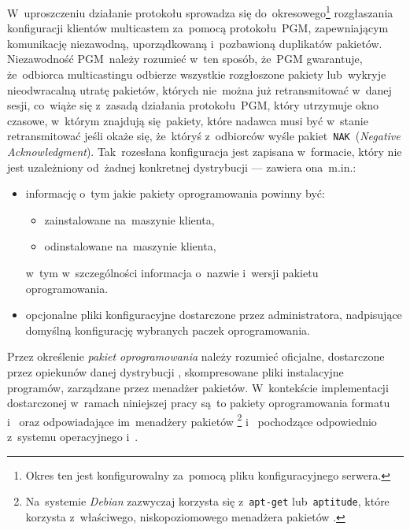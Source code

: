 \documentclass[thesis]{subfiles}
\begin{document}
W~uproszczeniu działanie protokołu sprowadza się do~okresowego\footnote{Okres ten jest konfigurowalny za~pomocą pliku konfiguracyjnego serwera.} rozgłaszania konfiguracji klientów multicastem za~pomocą protokołu~PGM, zapewniającym komunikację niezawodną, uporządkowaną i~pozbawioną duplikatów pakietów. Niezawodność PGM~należy rozumieć w~ten sposób, że~PGM gwarantuje, że~odbiorca multicastingu odbierze wszystkie rozgłoszone pakiety lub~wykryje nieodwracalną utratę pakietów, których nie~można już retransmitować w~danej sesji, co~wiąże się z~zasadą działania protokołu~PGM, który utrzymuje okno czasowe, w~którym znajdują się~pakiety, które nadawca musi być w~stanie retransmitować jeśli okaże się, że~któryś z~odbiorców wyśle pakiet~\texttt{NAK}~(\emph{Negative Acknowledgment}). Tak~rozesłana konfiguracja jest zapisana w~formacie, który nie jest uzależniony od~żadnej konkretnej dystrybucji  --- zawiera ona~m.in.:
\begin{itemize}
	\item informację o~tym jakie pakiety oprogramowania powinny być:
	\begin{itemize}
		\item zainstalowane na~maszynie klienta,
		\item odinstalowane na~maszynie klienta,
	\end{itemize}
	w~tym w~szczególności informacja o~nazwie i~wersji pakietu oprogramowania.
	\item opcjonalne pliki konfiguracyjne dostarczone przez administratora, nadpisujące domyślną konfigurację wybranych paczek oprogramowania.
\end{itemize}

Przez określenie \emph{pakiet oprogramowania} należy rozumieć oficjalne, dostarczone przez opiekunów danej dystrybucji , skompresowane pliki instalacyjne programów, zarządzane przez menadżer pakietów. W~kontekście implementacji dostarczonej w~ramach niniejszej pracy są~to pakiety oprogramowania formatu~ i~ oraz odpowiadające im~menadżery pakietów \footnote{Na~systemie \emph{Debian} zazwyczaj korzysta się z~\texttt{apt-get} lub~\texttt{aptitude}, które korzysta z~właściwego, niskopoziomowego menadżera pakietów .} i~ pochodzące odpowiednio z~systemu operacyjnego  i~.
\end{document}
